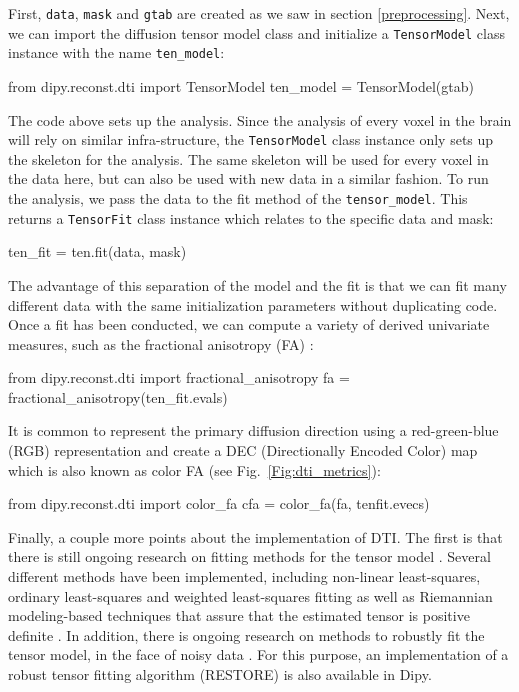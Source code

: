 \documentclass{bioinfo}
\begin{document}
First, \texttt{data}, \texttt{mask} and \texttt{gtab} are created as we saw in
section \ref{preprocessing}. Next, we can import the diffusion tensor model class
and initialize a \texttt{TensorModel} class instance with the name
\texttt{ten\_model}:
\begin{python}
from dipy.reconst.dti import TensorModel
ten_model = TensorModel(gtab)
\end{python}
The code above sets up the analysis.  Since
the analysis of every voxel in the brain will rely on similar infra-structure,
the \texttt{TensorModel} class instance only sets up the skeleton for the
analysis. The same skeleton will be used for every voxel in the
data here, but can also be used with new data in a similar fashion.  To run
the analysis,
we pass the data to the fit method of the \texttt{tensor\_model}. This returns
a \texttt{TensorFit} class instance which relates to the specific data and
mask:
\begin{python}
ten_fit = ten.fit(data, mask)
\end{python}
The advantage of this separation of the model and the fit is that we can fit
many different data with the same initialization parameters without duplicating
code. Once a fit has been conducted, we can compute a variety of derived
univariate measures, such as the fractional anisotropy (FA) \citep{Basser1996}:
\begin{python}
from dipy.reconst.dti import fractional_anisotropy
fa = fractional_anisotropy(ten_fit.evals)
\end{python}
It is common to represent the primary diffusion direction using a red-green-blue
(RGB) representation and create a DEC (Directionally Encoded Color) map
\citep{pierpaoli-jezzard-etal:96, pajevic-pierpaoli:99} which is also known as
color FA (see Fig.~\ref{Fig:dti_metrics}):
\begin{python}
from dipy.reconst.dti import color_fa
cfa = color_fa(fa, tenfit.evecs)
\end{python}
Finally, a couple more points about the implementation of DTI. The first is that there is still ongoing research on fitting methods for the tensor model
\citep{Koay2006}. Several different methods have been implemented, including
non-linear least-squares, ordinary least-squares and weighted least-squares
fitting \citep{chung-lu-etal:06} as well as Riemannian modeling-based
techniques that assure that the estimated tensor is positive definite
\citep{lenglet-rousson-etal:jmiv,arsigny-fillard-etal:06}. In
addition, there is ongoing research on
methods to robustly fit the tensor model, in the face of noisy data
\citep{Chang2005, Chang2012}. For this purpose, an implementation of a robust
tensor fitting algorithm (RESTORE) is also available in Dipy.
\end{document}
